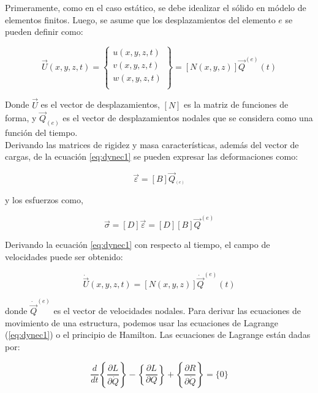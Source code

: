 Primeramente, como en el caso estático, se debe idealizar el sólido en módelo de elementos finitos. 
Luego, se asume que los desplazamientos del elemento $e$ se pueden definir como:

\begin{equation}\label{eq:dynec1}
\vec{U}(x,y,z,t) = 
\left\{ \begin{matrix}
u(x,y,z,t) \\ v(x,y,z,t) \\ w(x,y,z,t) \\
\end{matrix} \right\} = 
[N(x,y,z)] \vec{Q}^{(e)}(t)
\end{equation}

Donde $\vec{U}$ es el vector de desplazamientos, $[N]$ es la matriz de funciones de forma, y $\vec{Q}_{(e)}$ 
es el vector de desplazamientos nodales que se considera como una función del tiempo.\\

Derivando las matrices de rigidez y masa características, además del vector de cargas, de la ecuación \ref{eq:dynec1} 
se pueden expresar las deformaciones como:

\begin{equation}
\vec{\varepsilon} = [B] \vec{Q}_^{(e)}
\end{equation}

y los esfuerzos como,

\begin{equation}
\vec{\sigma} = [D] \vec{\varepsilon} = [D][B] \vec{Q}^{(e)}
\end{equation}

Derivando la ecuación \ref{eq:dynec1} con respecto al tiempo, el campo de velocidades puede ser obtenido: 

\begin{equation}
\dot{\vec{U}}(x,y,z,t) = [N(x,y,z)]\dot{\vec{Q}}^{(e)} (t)
\end{equation}

donde $\dot{\vec{Q}}^{(e)}$ es el vector de velocidades nodales. Para derivar las ecuaciones de movimiento de 
una estructura, podemos usar las ecuaciones de Lagrange (\ref{eq:dynec1}) o el principio de Hamilton. Las 
ecuaciones de Lagrange están dadas por:

\begin{equation}
\frac{d}{dt} \left\{ \frac{\partial L}{\partial \dot{Q}} \right\}- 
\left\{ \frac{\partial L}{\partial Q} \right\} + 
\left\{ \frac{\partial R}{\partial \dot{Q}} \right\} = \{0\}
\end{equation}

